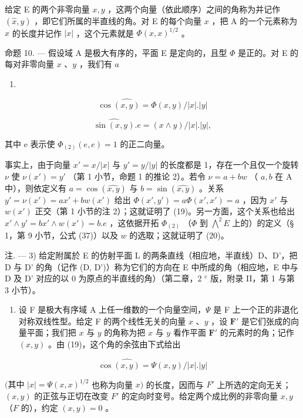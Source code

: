给定 E 的两个非零向量 \(x, y\) ，这两个向量（依此顺序）之间的角称为并记作 \((\widehat{x}, y)\) ，即它们所属的半直线的角。对 E 的每个向量 \(x\) ，把 A 的一个元素称为 \(x\) 的长度并记作 \(|x|\) ，这个元素就是 \(\Phi(x, x)^{1/2}\) 。

命题 10. --- 假设域 A 是极大有序的，平面 E 是定向的，且型 \(\Phi\) 是正的。对 E 的每对非零向量 \(x\) 、\(y\) ，我们有 \(a\)

\begin{enumerate}
\def\labelenumi{(\arabic{enumi})}
\setcounter{enumi}{18}
\tightlist
\item
\end{enumerate}

\[
\cos \widehat {(x , y)} = \Phi (x, y) / | x |. | y |\tag{20}
\]

\[
\widehat {\sin (x , y)}. e = (x \wedge y) / | x |. | y |,
\]

其中 e 表示使 \(\Phi_{(2)}(e, e) = 1\) 的正二向量。

事实上，由于向量 \(x' = x / |x|\) 与 \(y' = y / |y|\) 的长度都是 1，存在一个且仅一个旋转 \(\nu\) 使 \(\nu(x') = y'\) （第 1 小节，命题 1 的推论 2）。若令 \(\nu = a + bw\) （ \(a, b\) 在 A 中），则依定义有 \(a = \cos(\widehat{x,y})\) 与 \(b = \sin(\widehat{x,y})\) 。关系 \(y' = \nu(x') = ax' + bw(x')\) 给出 \(\Phi(x', y') = a\Phi(x', x') = a\) ，因为 \(x'\) 与 \(w(x')\) 正交（第 1 小节的注 2）；这就证明了 (19)。另一方面，这个关系也给出 \(x' \wedge y' = bx' \wedge w(x') = b.e\) ，这依据开拓 \(\Phi_{(2)}\) （\(\Phi\) 到 \(\bigwedge^{2} E\) 上的）的定义（§ 1，第 9 小节，公式 (37)）以及 \(w\) 的选取；这就证明了 (20)。

注. --- 3) 给定附属於 E 的仿射平面 L 的两条直线（相应地，半直线）D、D'，把 D 与 D' 的角（记作 (D, D')）称为它们的方向在 E 中所成的角（相应地，E 中与 D 及 D' 对应的以 0 为原点的半直线的角）（第二章，2 \(^{e}\) 版，附录 II，第 1 与第 3 小节）。

\begin{enumerate}
\def\labelenumi{\arabic{enumi})}
\setcounter{enumi}{3}
\tightlist
\item
  设 F 是极大有序域 A 上任一维数的一个向量空间，\(\Psi\) 是 F 上一个正的非退化对称双线性型。给定 F 的两个线性无关的向量 \(x\) 、\(y\) ，设 \(\mathbf{F}'\) 是它们张成的向量平面；我们把 \(x\) 与 \(y\) 的角称为把 \(x\) 与 \(y\) 看作平面 \(\mathbf{F}'\) 的元素时的角；记作 \((x,y)\) 。由 (19)，这个角的余弦由下式给出
\end{enumerate}

\[
\cos \widehat {(x , y)} = \Psi (x, y) / | x |. | y |\tag{21}
\]

\((\text{其中 } |x| = \Psi(x, x)^{1/2}\) 也称为向量 \(x)\) 的长度，因而与 \(F'\) 上所选的定向无关；\((x, y)\) 的正弦与正切在改变 \(F'\) 的定向时变号。给定两个成比例的非零向量 \(x, y\) （\(F\) 的），约定 \((x, y) = 0\) 。
